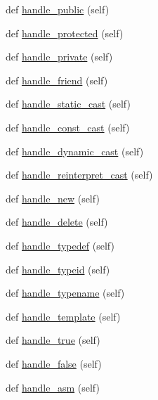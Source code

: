 \begin{DoxyCompactItemize}
def \hyperlink{classcpp_1_1ast_1_1AstBuilder_a1e69925578e0ee0a2b7aeb219eda449b}{handle\+\_\+public} (self)
\item 
def \hyperlink{classcpp_1_1ast_1_1AstBuilder_aa4ff62142927f8f245a2030b444676ee}{handle\+\_\+protected} (self)
\item 
def \hyperlink{classcpp_1_1ast_1_1AstBuilder_a8bc5f9563f5ead3abba5a71187162867}{handle\+\_\+private} (self)
\item 
def \hyperlink{classcpp_1_1ast_1_1AstBuilder_ab9f7d81019317c6ccfd492bd2c0c9579}{handle\+\_\+friend} (self)
\item 
def \hyperlink{classcpp_1_1ast_1_1AstBuilder_ab7577b3a2bd22c1bccb656493de379f3}{handle\+\_\+static\+\_\+cast} (self)
\item 
def \hyperlink{classcpp_1_1ast_1_1AstBuilder_a4dae74f1d036f63fc1080962ab0208fc}{handle\+\_\+const\+\_\+cast} (self)
\item 
def \hyperlink{classcpp_1_1ast_1_1AstBuilder_a659b5ad02ffebe26c1496a319128fbd1}{handle\+\_\+dynamic\+\_\+cast} (self)
\item 
def \hyperlink{classcpp_1_1ast_1_1AstBuilder_a06d75904ba7487c7966d073aaa3d74e9}{handle\+\_\+reinterpret\+\_\+cast} (self)
\item 
def \hyperlink{classcpp_1_1ast_1_1AstBuilder_a86f5769e0460524691ae0d135d30f101}{handle\+\_\+new} (self)
\item 
def \hyperlink{classcpp_1_1ast_1_1AstBuilder_aa5b7a781afe524bebdf42bdeb4766507}{handle\+\_\+delete} (self)
\item 
def \hyperlink{classcpp_1_1ast_1_1AstBuilder_a808eb3d955ca2e3a957abb35dc577c66}{handle\+\_\+typedef} (self)
\item 
def \hyperlink{classcpp_1_1ast_1_1AstBuilder_ac30cfc1a3a455310a9ccac885d2d0d7c}{handle\+\_\+typeid} (self)
\item 
def \hyperlink{classcpp_1_1ast_1_1AstBuilder_a4b7b3bb4f47f67052b04e5da173d1c6b}{handle\+\_\+typename} (self)
\item 
def \hyperlink{classcpp_1_1ast_1_1AstBuilder_a0f4d74520697ec05eb6b549daada5a5d}{handle\+\_\+template} (self)
\item 
def \hyperlink{classcpp_1_1ast_1_1AstBuilder_ad480255644817388b81b05acc4aa9c9a}{handle\+\_\+true} (self)
\item 
def \hyperlink{classcpp_1_1ast_1_1AstBuilder_afe125e384026baf74b55593b254fc10c}{handle\+\_\+false} (self)
\item 
def \hyperlink{classcpp_1_1ast_1_1AstBuilder_acf6ec42d567cd85a9bad77772c381a4e}{handle\+\_\+asm} (self)

\end{DoxyCompactItemize}
